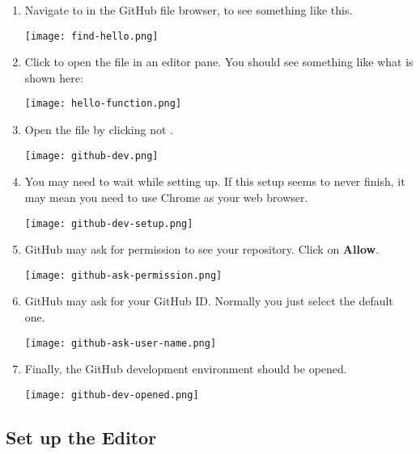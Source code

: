\begin{enumerate}
\item Navigate to  in the GitHub file browser, to see something like this.

\noindent\texttt{[image: find-hello.png]}



\item Click  to open the file in an editor pane.  You
  should see something like what is shown here:

\noindent\texttt{[image: hello-function.png]}


\item Open the file by clicking  not .

\noindent\texttt{[image: github-dev.png]}


\item You may need to wait while setting up. If this setup seems to
  never finish, it may mean you need to use Chrome as your web
  browser.

\noindent\texttt{[image: github-dev-setup.png]}


\item GitHub may ask for permission to see your repository.  Click on \textbf{Allow}.
  
\noindent\texttt{[image: github-ask-permission.png]}
  

\item GitHub may ask for your GitHub ID.  Normally you just select the default one.
  
\noindent\texttt{[image: github-ask-user-name.png]}

\item Finally, the GitHub development environment should be opened.
  
\noindent\texttt{[image: github-dev-opened.png]}



\end{enumerate}

\subsection{Set up the Editor}
  
